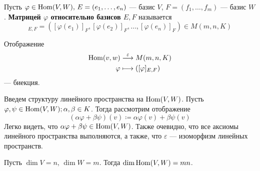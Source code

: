 \documentclass[../main.tex]{subfiles}
\begin{document}
\begin{definition}
\label{def:7.1}
  Пусть $\varphi \in \operatorname{Hom}(V, W),\, E = (e_1, \dotsc, e_n)$ --- базис $V$, $F = (f_1, \dotsc, f_m)$ --- базис $W$. \textbf{Матрицей $\varphi$ относительно базисов $E, F$} называется
  \begin{equation*}
    [\varphi]_{E, F} = ([\varphi(e_1)]_F, [\varphi(e_2)]_F, \dotsc, [\varphi(e_n)]_F) \in M(m, n, K)
  \end{equation*}
\end{definition}

\begin{corollary*}
  Отображение
  \begin{align*}
    \operatorname{Hom}(v, w) &\overset{\varepsilon}{\longrightarrow} M(m, n, K) \\
    \varphi &\longmapsto([\varphi]_{E, F})
  \end{align*}
  --- биекция.
\end{corollary*}

Введем структуру линейного пространства на $\operatorname{Hom}(V, W)$.
Пусть $\varphi, \psi \in \operatorname{Hom}(V, W); \alpha, \beta \in K$. Тогда рассмотрим отображение
\begin{equation*}
  (\alpha \varphi + \beta \psi)(v) \coloneqq \alpha \varphi(v) + \beta \psi(v)
\end{equation*}
Легко видеть, что $\alpha \varphi + \beta \psi \in \operatorname{Hom}(V, W)$. Также очевидно, что все аксиомы линейного пространства выполняются, а также, что $\varepsilon$ --- изоморфизм линейных пространств.

\begin{corollary*}
  Пусть $\dim V = n,\, \dim W = m$. Тогда $\dim \operatorname{Hom}(V, W) = mn$.
\end{corollary*}
\end{document}
